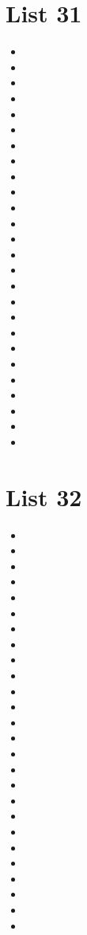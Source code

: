 \documentclass[a4paper,10pt]{article}
\begin{document}
\begin{CJK*}{UTF8}{gkai}
\newpage
\section{List 31}
\begin{itemize}
\item 
\item 
\item 
\item 
\item 
\item 
\item 
\item 
\item 
\item 
\item 
\item 
\item 
\item 
\item 
\item 
\item 
\item 
\item 
\item 
\item 
\item 
\item 
\item 
\item 
\item 
\end{itemize}

\newpage
\section{List 32}
\begin{itemize}
\item 
\item 
\item 
\item 
\item 
\item 
\item 
\item 
\item 
\item 
\item 
\item 
\item 
\item 
\item 
\item 
\item 
\item 
\item 
\item 
\item 
\item 
\item 
\item 
\item 
\item 
\end{itemize}
\end{CJK*}
\end{document}
